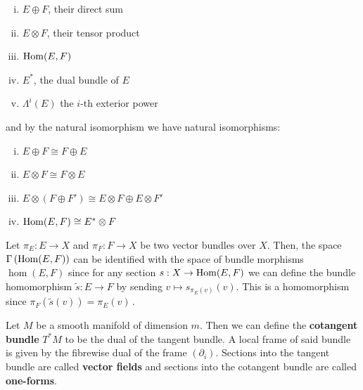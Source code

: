 	\begin{enumerate}[(i)]
		\item $E\oplus F $, their direct sum
		\item $E\otimes F$, their tensor product
		\item $\operatorname{\mathrm{Hom}}(E,F)$
		\item $E^*$, the dual bundle of $E$ 
		\item $\Lambda^i(E)$ the $i$-th exterior power
	\end{enumerate} and by the natural isomorphism we have natural isomorphisms: 
	\begin{enumerate}[(i)]
		\item $E\oplus F \cong F\oplus E$
		\item $E\otimes F\cong F \otimes E$
		\item $E\otimes (F\oplus F')\cong E\otimes F \oplus E\otimes F'$
		\item $\operatorname{\mathrm{Hom}}(E,F) \cong E^*\otimes F$
	\end{enumerate}
	
	
	\begin{corollary}\label{cor:vb-sectionsIntoHom}
		Let $\pi_E:E\to X$ and $\pi_F:F\to X$ be two vector bundles over $X$.
		 Then, the space $\Gamma \left(\operatorname{\mathrm{Hom}}(E,F)\right)$ can be identified with the space of bundle morphisms $\hom(E,F)$ since for any section $s:X\to \operatorname{\mathrm{Hom}}(E,F)$ we can define the bundle homomorphism $\tilde{s}:E\to F$ by sending $v\mapsto s_{\pi_E(v)}(v)$. 
		 This is a homomorphism since $\pi_F\left( \tilde{s}(v)\right)=\pi_E(v)$\,. 
	\end{corollary}
	\begin{example}
		Let $M$ be a smooth manifold of dimension $m$. Then we can define the \textbf{cotangent bundle} $T^*M$ to be the dual of the tangent bundle. A local frame of said bundle is given by the fibrewise dual of the frame $(\partial_i) $. Sections into the tangent bundle are called \textbf{vector fields} and sections into the cotangent bundle are called \textbf{one-forms}.  
	\end{example} 
	
